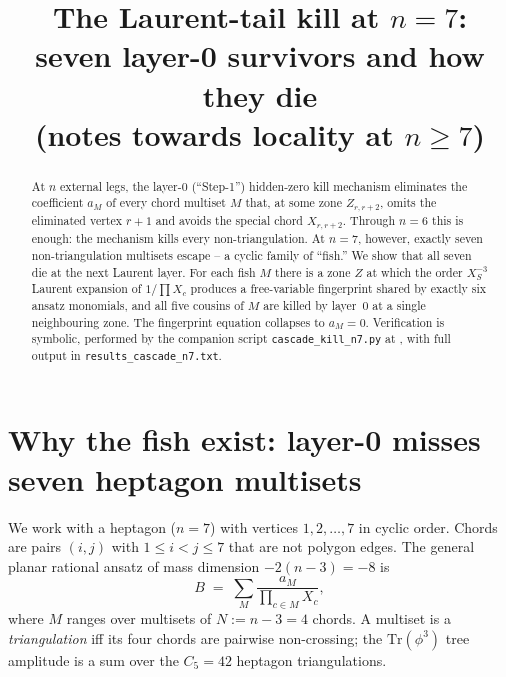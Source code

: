 \documentclass[11pt]{article}
\title{The Laurent-tail kill at $n=7$:\\
       seven layer-0 survivors and how they die\\
       \small{(notes towards locality at $n\ge 7$)}}
\date{}
\theoremstyle{definition}
\begin{document}
\maketitle

\begin{abstract}
At $n$ external legs, the layer-0 (``Step-1'') hidden-zero kill mechanism
eliminates the coefficient $a_M$ of every chord multiset $M$ that, at
some zone $Z_{r,r+2}$, omits the eliminated vertex $r{+}1$ and avoids
the special chord $X_{r,r+2}$. Through $n=6$ this is enough: the
mechanism kills every non-triangulation. At $n=7$, however, exactly
seven non-triangulation multisets escape -- a cyclic family of ``fish.''
We show that all seven die at the next Laurent layer. For each fish
$M$ there is a zone $Z$ at which the order $X_S^{-3}$ Laurent expansion
of $1/\prod X_c$ produces a free-variable fingerprint shared by exactly
six ansatz monomials, and all five cousins of $M$ are killed by layer~0
at a single neighbouring zone. The fingerprint equation collapses to
$a_M=0$. Verification is symbolic, performed by the companion script
\verb|cascade_kill_n7.py| at \cite{repo}, with full output in
\verb|results_cascade_n7.txt|.
\end{abstract}

\section{Why the fish exist: layer-0 misses seven heptagon multisets}

We work with a heptagon ($n=7$) with vertices $1,2,\dots,7$ in cyclic
order. Chords are pairs $(i,j)$ with $1\le i<j\le 7$ that are not
polygon edges. The general planar rational ansatz of mass dimension
$-2(n{-}3)=-8$ is
\[
   B \;=\; \sum_{M} \frac{a_M}{\prod_{c\in M} X_c},
\]
where $M$ ranges over multisets of $N := n{-}3 = 4$ chords. A multiset
is a \emph{triangulation} iff its four chords are pairwise non-crossing;
the $\mathrm{Tr}(\phi^3)$ tree amplitude is a sum over the $C_5=42$
heptagon triangulations.
\end{document}
